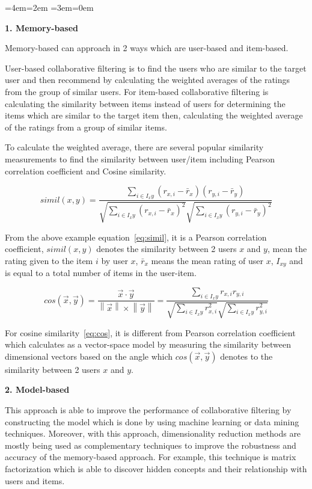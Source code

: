 \documentclass[12pt,oneside,openright,a4paper]{cpe-english-project}
\newenvironment{blockquote}{%
  \par%
  \medskip
  \leftskip=4em\rightskip=2em%
  \noindent\ignorespaces}{%
  \par\medskip}
\begin{document}
\begin{blockquote}\leftskip=3em\rightskip=0em

\textbf{1. Memory-based}\par

Memory-based can approach in 2 ways which are user-based and item-based.

User-based collaborative filtering is to find the users who are similar to the target user and then recommend by calculating the weighted averages of the ratings from the group of similar users. For item-based collaborative filtering is calculating the similarity between items instead of users for determining the items which are similar to the target item then, calculating the weighted average of the ratings from a group of similar items.

To calculate the weighted average, there are several popular similarity measurements to find the similarity between user/item including Pearson correlation coefficient and Cosine similarity.

\begin{equation}\label{eq:simil}
simil(x, y) = \frac{\sum_{i\in I_xy}^{}(r_{x,i}-\bar{r}_{x})(r_{y,i}-\bar{r}_{y})}
{\sqrt{\sum_{i\in I_xy}^{}(r_{x,i}-\bar{r}_{x})^2}\sqrt{\sum_{i\in I_xy}^{}(r_{y,i}-\bar{r}_{y})^2}}
\end{equation}

From the above example equation~\ref{eq:simil}, it is a Pearson correlation coefficient, $simil(x, y)$ denotes the similarity between 2 users $x$ and $y$, mean the rating given to the item $i$ by user $x$, $\bar{r}_{x}$ means the mean rating of user $x$, $I_{xy}$ and is equal to a total number of items in the user-item.


\begin{equation}\label{eq:cos}
cos(\vec{x},\vec{y}) 
=\frac{\vec{x}\cdot \vec{y}}{\left \| \vec{x} \right \|\times \left \| \vec{y} \right \|}
=\frac{\sum_{i\in I_xy}^{}r_{x,i}r_{y,i}}
{\sqrt{\sum_{i\in I_xy}^{}r_{x,i}^2}\sqrt{\sum_{i\in I_xy}^{}r_{y,i}^2}}
\end{equation}

For cosine similarity~\ref{eq:cos}, it is different from Pearson correlation coefficient which calculates as a vector-space model by measuring the similarity between dimensional vectors based on the angle which $cos(\vec{x},\vec{y})$ denotes to the similarity between 2 users $x$ and $y$.


\textbf{2. Model-based}\par

This approach is able to improve the performance of collaborative filtering by constructing the model which is done by using machine learning or data mining techniques. Moreover, with this approach, dimensionality reduction methods are mostly being used as complementary techniques to improve the robustness and accuracy of the memory-based approach. \cite{Recommendersystem} For example, this technique is matrix factorization which is able to discover hidden concepts and their relationship with users and items.

\end{blockquote}
\end{document}
